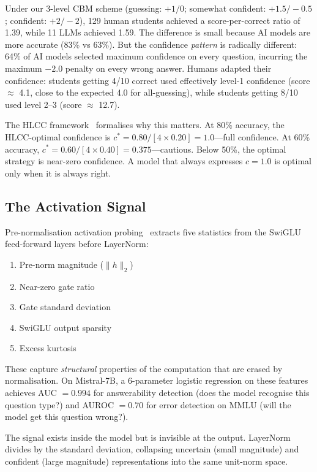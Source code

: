 \documentclass[11pt,a4paper]{article}
\begin{document}
Under our 3-level CBM scheme (guessing: $+1/0$; somewhat confident: $+1.5/-0.5$; confident: $+2/-2$), 129 human students achieved a score-per-correct ratio of 1.39, while 11 LLMs achieved 1.59.
The difference is small because AI models are more accurate (83\% vs 63\%).
But the confidence \emph{pattern} is radically different: 64\% of AI models selected maximum confidence on every question, incurring the maximum $-2.0$ penalty on every wrong answer.
Humans adapted their confidence: students getting 4/10 correct used effectively level-1 confidence (score $\approx$ 4.1, close to the expected 4.0 for all-guessing), while students getting 8/10 used level 2--3 (score $\approx$ 12.7).

The HLCC framework~\citep{mccallum2026hlcc} formalises why this matters.
At 80\% accuracy, the HLCC-optimal confidence is $c^* = 0.80/[4 \times 0.20] = 1.0$---full confidence.
At 60\% accuracy, $c^* = 0.60/[4 \times 0.40] = 0.375$---cautious.
Below 50\%, the optimal strategy is near-zero confidence.
A model that always expresses $c = 1.0$ is optimal only when it is always right.

\subsection{The Activation Signal}

Pre-normalisation activation probing~\citep{mccallum2026activation} extracts five statistics from the SwiGLU feed-forward layers before LayerNorm:
\begin{enumerate}
    \item Pre-norm magnitude ($\|h\|_2$)
    \item Near-zero gate ratio
    \item Gate standard deviation
    \item SwiGLU output sparsity
    \item Excess kurtosis
\end{enumerate}

These capture \emph{structural} properties of the computation that are erased by normalisation.
On Mistral-7B, a 6-parameter logistic regression on these features achieves AUC $= 0.994$ for answerability detection (does the model recognise this question type?) and AUROC $= 0.70$ for error detection on MMLU (will the model get this question wrong?).

The signal exists inside the model but is invisible at the output.
LayerNorm divides by the standard deviation, collapsing uncertain (small magnitude) and confident (large magnitude) representations into the same unit-norm space.
\end{document}
